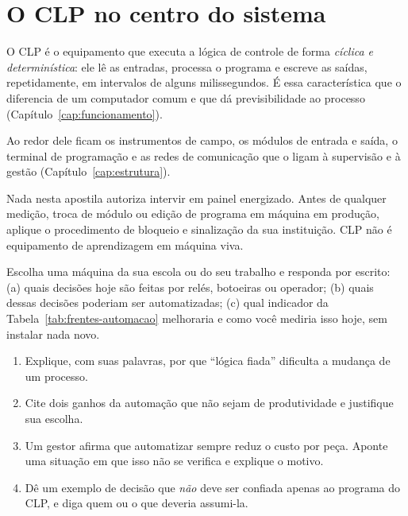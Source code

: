 \section{O CLP no centro do sistema}

O CLP é o equipamento que executa a lógica de controle de forma \emph{cíclica e determinística}:
ele lê as entradas, processa o programa e escreve as saídas, repetidamente, em intervalos de
alguns milissegundos. É essa característica que o diferencia de um computador comum e que dá
previsibilidade ao processo (Capítulo~\ref{cap:funcionamento}).

Ao redor dele ficam os instrumentos de campo, os módulos de entrada e saída, o terminal de
programação e as redes de comunicação que o ligam à supervisão e à gestão
(Capítulo~\ref{cap:estrutura}).


\begin{atencao}
Nada nesta apostila autoriza intervir em painel energizado. Antes de qualquer medição, troca de
módulo ou edição de programa em máquina em produção, aplique o procedimento de bloqueio e
sinalização da sua instituição. CLP não é equipamento de aprendizagem em máquina viva.
\end{atencao}

\begin{pratica}
Escolha uma máquina da sua escola ou do seu trabalho e responda por escrito:
(a) quais decisões hoje são feitas por relés, botoeiras ou operador;
(b) quais dessas decisões poderiam ser automatizadas;
(c) qual indicador da Tabela~\ref{tab:frentes-automacao} melhoraria e como você mediria isso hoje,
sem instalar nada novo.
\end{pratica}

\enlargethispage{2\baselineskip}

\begin{exercicios}
\begin{enumerate}[label=\alph*)]
  \item Explique, com suas palavras, por que ``lógica fiada'' dificulta a mudança de um processo.
  \item Cite dois ganhos da automação que não sejam de produtividade e justifique sua escolha.
  \item Um gestor afirma que automatizar sempre reduz o custo por peça. Aponte uma situação em que
        isso não se verifica e explique o motivo.
  \item Dê um exemplo de decisão que \emph{não} deve ser confiada apenas ao programa do CLP, e diga
        quem ou o que deveria assumi-la.
\end{enumerate}
\end{exercicios}
